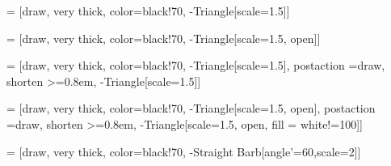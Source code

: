 



\contourlength{1.2pt}
 = [draw, very thick, color=black!70, -{Triangle[scale=1.5]}]

\newcommand{\SymmetricReference}[5]{
\path [triangle] (#4) #3 (#2);
\path [triangle] (#2) #3 (#4) node [midway, above, text width = 2cm, align= center, #5] (TextNode) {\contour{white}{#1}};
}

\newcommand{\AsymmetricReference}[5]{
\path [triangle] (#2) #3 (#4) node [midway, above, text width = 2cm, align= center, #5] (TextNode) {\contour{white}{#1}};
}

 = [draw, very thick, color=black!70, -{Triangle[scale=1.5, open]}]

\newcommand{\HasEventSource}[5]{
\path [triangle2] (#2) #3 (#4) node [midway, above, text width = 2cm, align= center, #5] (TextNode) {\contour{white}{#1}};
}

 = [draw, very thick, color=black!70, -{Triangle[scale=1.5]}, postaction ={draw, shorten >=0.8em, -{Triangle[scale=1.5]}}]

\newcommand{\HasTypeDefinition}[5]{
\path [triangle3] (#2) #3 (#4) node [midway, above, text width = 2cm, align= center, #5] (TextNode) {\contour{white}{#1}};
}

 = [draw, very thick, color=black!70, -{Triangle[scale=1.5, open]}, postaction ={draw, shorten >=0.8em, -{Triangle[scale=1.5, open, fill = white!=100]}}]

\newcommand{\HasSubType}[5]{
\path [triangle4] (#4) #3 (#2) node [midway, above, text width = 2cm, align= center, #5] (TextNode) {\contour{white}{#1}};
}

 = [draw, very thick, color=black!70, -{Straight Barb[angle'=60,scale=2]}]

\newcommand{\HierarchicalReference}[5]{
\path [angle] (#2) #3 (#4) node [midway, above, text width = 2cm, align= center, #5] (TextNode) {\contour{white}{#1}};
}

